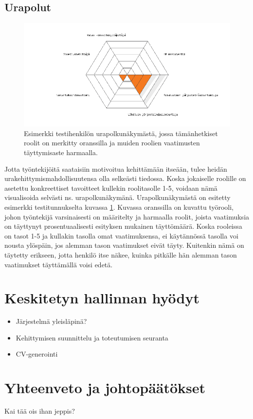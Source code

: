 \documentclass[a4paper,finnish,12pt]{article}
\begin{document}
\subsection{Urapolut}

\begin{figure}[ht]
\centering
\includegraphics[width=1\textwidth]{urapolkuPlot_tst_usr.png}
\caption{Esimerkki testihenkilön urapolkunäkymästä, jossa tämänhetkiset roolit on merkitty oranssilla ja muiden roolien vaatimusten täyttymisaste harmaalla.}
\label{fig:urapolkuspiderweb}
\end{figure}

Jotta työntekijöitä saataisiin motivoitua kehittämään itseään, tulee heidän urakehittymismahdollisuutensa olla selkeästi tiedossa. Koska jokaiselle roolille on asetettu konkreettiset tavoitteet kullekin roolitasolle 1-5, voidaan nämä visualisoida selvästi ns. urapolkunäkymänä. Urapolkunäkymästä on esitetty esimerkki testitunnukselta kuvassa \ref{fig:urapolkuspiderweb}. Kuvassa oranssilla on kuvattu työrooli, johon työntekijä varsinaisesti on määritelty ja harmaalla roolit, joista vaatimuksia on täyttynyt prosentuaalisesti esityksen mukainen täyttömäärä. Koska rooleissa on tasot 1-5 ja kullakin tasolla omat vaatimuksensa, ei käytännössä tasolla voi nousta ylöspäin, jos alemman tason vaatimukset eivät täyty. Kuitenkin nämä on täytetty erikseen, jotta henkilö itse näkee, kuinka pitkälle hän alemman tason vaatimukset täyttämällä voisi edetä.

\clearpage

\section{Keskitetyn hallinnan hyödyt}

\begin{itemize}
\item Järjestelmä yleisläpinä?
\item Kehittymisen suunnittelu ja toteutumisen seuranta
\item CV-generointi
\end{itemize}

\clearpage

\section{Yhteenveto ja johtopäätökset}

Kai tää ois ihan jeppis?

\clearpage

\clearpage



\appendix
\end{document}
